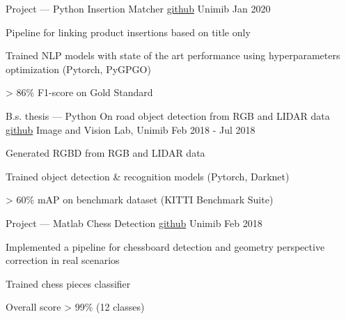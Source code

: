 

\begin{cventries}





\cventry
{Project --- Python}
{Insertion Matcher \tiny \href{https://github.com/belerico/insertion-matcher}{github}}
{Unimib}
{Jan 2020}
{
	\begin{cvitems} %
		\item Pipeline for linking product insertions based on title only
		\item Trained NLP models with state of the art performance using hyperparameters optimization (Pytorch, PyGPGO)
		\item > 86\% F1-score on Gold Standard
	\end{cvitems}
}


  \cventry
    {B.s. thesis --- Python} %
    {On road object detection from RGB and LIDAR data \tiny \href{https://github.com/gianscarpe/bachelor_thesis}{github}} %
    {Image and Vision Lab, Unimib} %
    {Feb 2018 - Jul 2018} %
    {
      \begin{cvitems} %
		\item Generated RGBD from RGB and LIDAR data
		\item Trained object detection \& recognition models (Pytorch, Darknet)
		\item > 60\% mAP on benchmark dataset (KITTI Benchmark Suite)
      \end{cvitems}
    }


\cventry
{Project --- Matlab}
{Chess Detection \tiny \href{https://github.com/gianscarpe/chess_detection}{github}}
{Unimib}
{Feb 2018}
{
	\begin{cvitems} %
		\item Implemented a pipeline for chessboard detection and geometry perspective correction in real scenarios 
		\item Trained chess pieces classifier
		\item Overall score > 99\% (12 classes)
	\end{cvitems}
}



    
\end{cventries}


